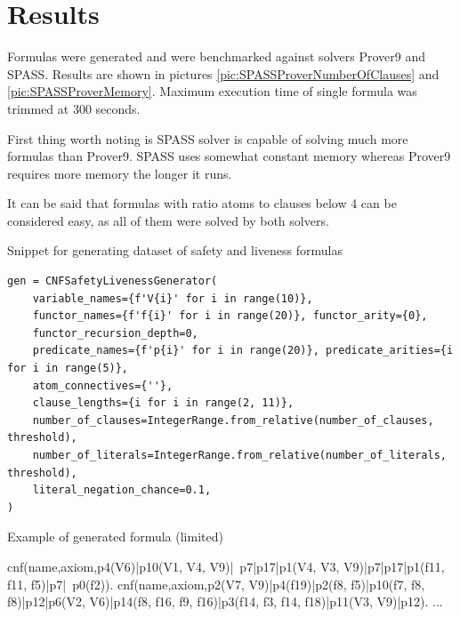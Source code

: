\section{Results}

Formulas were generated and were benchmarked against solvers Prover9 and SPASS. Results are shown in pictures \ref{pic:SPASSProverNumberOfClauses} and \ref{pic:SPASSProverMemory}. Maximum execution time of single formula was trimmed at 300 seconds. 

First thing worth noting is SPASS solver is capable of solving much more formulas than Prover9. SPASS uses somewhat constant memory whereas Prover9 requires more memory the longer it runs.

It can be said that formulas with ratio atoms to clauses below 4 can be considered easy, as all of them were solved by both solvers.

\begin{listing}[ht]
  \caption{Snippet for generating dataset of safety and liveness formulas}
  \label{lis:CNFSafetyLivenesSnippet}
\begin{verbatim}
gen = CNFSafetyLivenessGenerator(
    variable_names={f'V{i}' for i in range(10)},
    functor_names={f'f{i}' for i in range(20)}, functor_arity={0},
    functor_recursion_depth=0,
    predicate_names={f'p{i}' for i in range(20)}, predicate_arities={i for i in range(5)},
    atom_connectives={''},
    clause_lengths={i for i in range(2, 11)},
    number_of_clauses=IntegerRange.from_relative(number_of_clauses, threshold),
    number_of_literals=IntegerRange.from_relative(number_of_literals, threshold),
    literal_negation_chance=0.1,
)
\end{verbatim}
\end{listing}

\begin{listing}[ht]
  \caption{Example of generated formula (limited)}
\begin{tptpcode}
% 
cnf(name,axiom,p4(V6)|p10(V1, V4, V9)|~p7|p17|p1(V4, V3, V9)|p7|p17|p1(f11, f11, f5)|p7|~p0(f2)).
cnf(name,axiom,p2(V7, V9)|p4(f19)|p2(f8, f5)|p10(f7, f8, f8)|p12|p6(V2, V6)|p14(f8, f16, f9, f16)|p3(f14, f3, f14, f18)|p11(V3, V9)|p12).
...
\end{tptpcode}
\end{listing}

